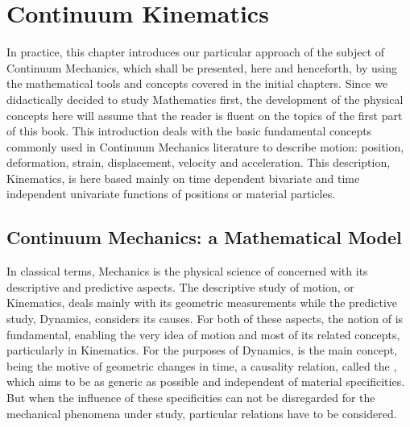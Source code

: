 \chapter{Continuum Kinematics}
In practice, this chapter introduces our particular approach of the subject of Continuum Mechanics, which shall be presented, here and henceforth, by using the mathematical tools and concepts covered in the initial chapters. Since we didactically decided to study Mathematics first, the development of the physical concepts here will assume that the reader is fluent on the topics of the first part of this book. This introduction deals with the basic fundamental concepts commonly used in Continuum Mechanics literature to describe motion: position, deformation, strain, displacement, velocity and acceleration. This description, Kinematics, is here based mainly on time dependent bivariate and time independent univariate functions of positions or material particles.          


\section{Continuum Mechanics: a Mathematical Model}

In classical terms, Mechanics is the physical science of  concerned with its descriptive and predictive aspects. The descriptive study of motion, or Kinematics, deals mainly with its geometric measurements while the predictive study, Dynamics, considers its causes. For both of these aspects, the notion of  is fundamental, enabling the very idea of motion and most of its related concepts, particularly in Kinematics. For the purposes of Dynamics,  is the main concept, being the motive of geometric changes in time, a causality relation, called the , which aims to be as generic as possible and independent of material specificities. But when the influence of these specificities can not be disregarded for the mechanical phenomena under study, particular  relations have to be considered. 


